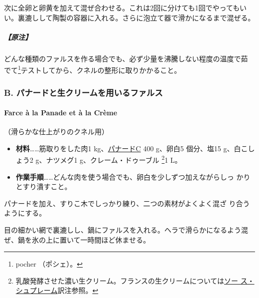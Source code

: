 \begin{recette}
次に全卵と卵黄を加えて混ぜ合わせる。これは2回に分けても1回でやってもい
い。裏漉しして陶製の容器に入れる。さらに泡立て器で滑かになるまで混ぜる。

\hypertarget{ux539fux6ce8}{%
\subparagraph{【原注】}\label{ux539fux6ce8}}

どんな種類のファルスを作る場合でも、必ず少量を沸騰しない程度の温度で茹
でて\footnote{pocher （ポシェ）。}テストしてから、クネルの整形に取りかかること。

\maeaki

\hypertarget{b.-ux30d1ux30caux30fcux30c9ux3068ux751fux30afux30eaux30fcux30e0ux3092ux7528ux3044ux308bux30d5ux30a1ux30ebux30b9}{%
\subsubsection{B.
パナードと生クリームを用いるファルス}\label{b.-ux30d1ux30caux30fcux30c9ux3068ux751fux30afux30eaux30fcux30e0ux3092ux7528ux3044ux308bux30d5ux30a1ux30ebux30b9}}

\hypertarget{farce-b}{%
\paragraph{Farce à la Panade et à la Crème}\label{farce-b}}


（滑らかな仕上がりのクネル用）

\begin{itemize}
\item
  \textbf{材料}\ldots{}\ldots{}筋取りをした肉1
  kg、\protect\hyperlink{panade-c}{パナードC} 400 g、卵白5 個分、塩15
  g、白こしょう2 g、ナツメグ1 g、クレーム・ドゥーブル \footnote{乳酸発酵させた濃い生クリーム。フランスの生クリームについては\protect\hyperlink{sauce-supreme}{ソー
    ス・シュプレーム}訳注参照。}1\undemi{} L。
\item
  \textbf{作業手順}\ldots{}\ldots{}どんな肉を使う場合でも、卵白を少しずつ加えながらしっ
  かりとすり潰すこと。
\end{itemize}

パナードを加え、すりこ木でしっかり練り、二つの素材がよくよく混ざ
り合うようにする。

目の細かい網で裏漉しし、鍋にファルスを入れる。ヘラで滑らかになるよう混
ぜ、鍋を氷の上に置いて一時間ほど休ませる。


\end{recette}
